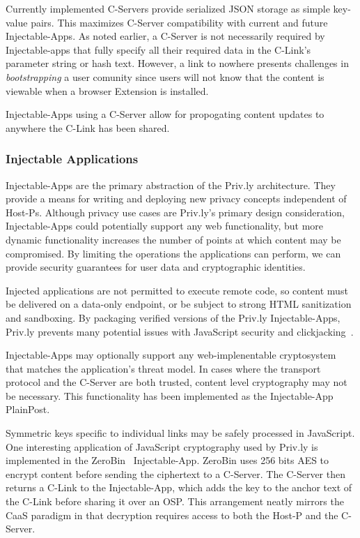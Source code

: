 \documentclass[letterpaper,twocolumn,10pt]{article}
\begin{document}
Currently implemented C-Servers provide serialized JSON storage as simple key-value 
pairs. This maximizes C-Server compatibility with current and future Injectable-Apps.
As noted earlier, a C-Server is not necessarily required by Injectable-apps that 
fully specify all their required data in the C-Link's parameter string or hash text.
However, a link to nowhere presents challenges in \emph{bootstrapping} a user comunity since
users will not know that the content is viewable when a browser Extension is installed.

Injectable-Apps using a C-Server allow for propogating content updates to anywhere the
C-Link has been shared.

\subsubsection{Injectable Applications} \label{sec:privly_injectable_applications}

Injectable-Apps are the primary abstraction of the Priv.ly architecture. They 
provide a means for writing and deploying new privacy concepts independent of 
Host-Ps. Although privacy use cases are Priv.ly's primary design consideration, 
Injectable-Apps could potentially support any web functionality, but more dynamic functionality increases the 
number of points at which content may be compromised. By limiting the operations 
the applications can perform, we can provide security guarantees for user data and 
cryptographic identities.

Injected applications are not permitted to execute remote code, so content must 
be delivered on a data-only endpoint, or be subject to strong HTML sanitization and
sandboxing. 
By packaging verified versions of the Priv.ly Injectable-Apps, Priv.ly prevents many 
potential issues with JavaScript security and clickjacking~\cite{Huang2012}.

Injectable-Apps may optionally support any web-implenentable cryptosystem
that matches the application's threat model.
In cases where the transport protocol and the C-Server are 
both trusted, content level cryptography may not be necessary. This 
functionality has been implemented as the Injectable-App PlainPost.

Symmetric keys specific to individual links 
may be safely processed in JavaScript. One interesting application of JavaScript 
cryptography used by Priv.ly is implemented in the ZeroBin~\cite{Sebsauvage2013} 
Injectable-App. ZeroBin uses 256 bits AES to encrypt content before sending the 
ciphertext to a C-Server. The C-Server then returns a C-Link to the 
Injectable-App, which adds the key to the anchor text of the C-Link before sharing 
it over an OSP. This arrangement neatly mirrors the CaaS paradigm in that 
decryption requires access to both the Host-P and the C-Server.
\end{document}
